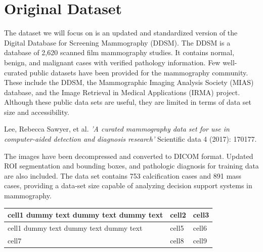 \documentclass{book}
\begin{document}
    \section{Original Dataset}
        The dataset we will focus on is an updated and standardized version of the Digital Database for Screening Mammography (DDSM). The DDSM is a database of 2,620 scanned film mammography studies. It contains normal, benign, and malignant cases with verified pathology information. Few well-curated public datasets have been provided for the mammography community. These include the DDSM, the Mammographic Imaging Analysis Society (MIAS) database, and the Image Retrieval in Medical Applications (IRMA) project. Although these public data sets are useful, they are limited in terms of data set size and accessibility.

        \begin{center}
            \begin{minipage}{0.9\linewidth}
                \vspace{5pt}%
                {\small
                    Lee, Rebecca Sawyer, et al. \textit{'A curated mammography data set for use in computer-aided detection and diagnosis research'} Scientific data 4 (2017): 170177.
                }
                \vspace{5pt}%
            \end{minipage}
        \end{center}

        The images have been decompressed and converted to DICOM format. Updated ROI segmentation and bounding boxes, and pathologic diagnosis for training data are also included. The data set contains 753 calcification cases and 891 mass cases, providing a data-set size capable of analyzing decision support systems in mammography.

        
        \begin{center}
            \begin{tabular}{ | m{5em} | m{1cm}| m{1cm} | } 
            \hline
            cell1 dummy text dummy text dummy text& cell2 & cell3 \\ 
            \hline
            cell1 dummy text dummy text dummy text & cell5 & cell6 \\ 
            \hline
            cell7 & cell8 & cell9 \\ 
            \hline
            \end{tabular}
        \end{center}
    
\end{document}
